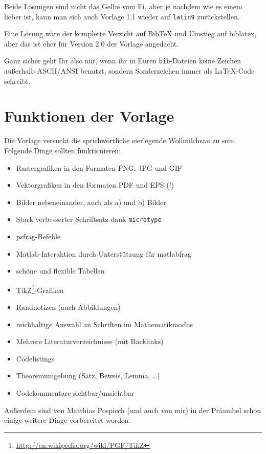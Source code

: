 Beide Lösungen sind nicht das Gelbe vom Ei, aber je nachdem wie es einem lieber ist, kann man sich auch Vorlage 1.1 wieder auf \texttt{latin9} zurückstellen.

Eine Lösung wäre der komplette Verzicht auf BibTeX und Umstieg auf biblatex, aber das ist eher für Version 2.0 der Vorlage angedacht.

Ganz sicher geht Ihr also nur, wenn ihr in Euren \texttt{bib}-Dateien keine Zeichen außerhalb ASCII/ANSI benutzt, sondern Sonderzeichen immer als LaTeX-Code schreibt. 

\section{Funktionen der Vorlage}
Die Vorlage versucht die sprichwörtliche eierlegende Wollmilchsau zu sein. Folgende Dinge sollten funktionieren:

\begin{itemize}
	\item Rastergrafiken in den Formaten PNG, JPG und GIF
	\item Vektorgrafiken in den Formaten PDF und EPS (!)
	\item Bilder nebeneinander, auch als a) und b) Bilder
	\item Stark verbesserter Schriftsatz dank \texttt{microtype}
	\item psfrag-Befehle
	\item Matlab-Interaktion durch Unterstützung für matlabfrag
	\item schöne und flexible Tabellen
	\item TikZ\footnote{\url{http://en.wikipedia.org/wiki/PGF/TikZ}}-Grafiken
	\item Randnotizen (auch Abbildungen)
	\item reichhaltige Auswahl an Schriften im Mathematikmodus
	\item Mehrere Literaturverzeichnisse (mit Backlinks)
	\item Codelistings
	\item Theoremumgebung (Satz, Beweis, Lemma, \dots)
	\item Codekommentare sichtbar/unsichtbar
\end{itemize}

Außerdem sind von Matthias Pospiech (und auch von mir) in der Präambel schon einige weitere Dinge vorbereitet worden.

